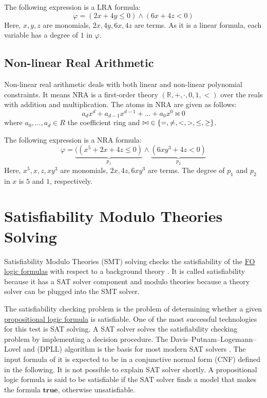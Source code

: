 \begin{example}
    The following expression is a LRA formula:
    $$ \varphi = ( 2x+4y\leq 0 ) \wedge ( 6x+4z< 0 )$$
    Here, $x, y, z$ are monomials, $2x, 4y, 6x, 4z$ are terms.
    As it is a linear formula, each variable has a degree of $1$ in $\varphi$.
\end{example}
\subsection{Non-linear Real Arithmetic}
\label{subsec:NRA}
Non-linear real arithmetic deals with both linear and non-linear polynomial constraints.
It means NRA is a first-order theory $(\mathbb{R}, +, \cdot, 0, 1, <)$ over the reals with addition and multiplication.
The atoms in NRA are given as follows:
$$ a_{d}x^{d} + a_{d-1}x^{d-1} + \ldots + a_{0}x^{0} \bowtie 0  $$
where $ a_{0}, \ldots, a_{d} \in R $ the coefficient ring and $ \bowtie \hspace{1mm}\in \{=, \neq, <, >, \leq, \geq \} $.\newline

\begin{example}
    The following expression is a NRA formula:
    $$ \varphi = \underbrace{ ( (x^{5}+2x+4z\leq 0 ) }\limits_{p_{1}} \wedge \underbrace{ ( 6xy^{3}+4z< 0 ) }\limits_{p_{2}} $$
    Here, $x^{5}, x, z, xy^{3}$ are monomials, $2x, 4z, 6xy^{3}$ are terms.
    The degree of $p_{1}$ and $p_{2}$ in $x$ is $5$ and $1$, respectively.
\end{example}
\section{Satisfiability Modulo Theories Solving}
\label{sec:SMT_Solver}
Satisfiability Modulo Theories (SMT) solving checks the satisfiability of the \hyperref[sec:FOLogic]{FO logic formulas} with respect to a background theory \cite{de2007tutorial}.
It is called satisfiability because it has a SAT solver component and modulo theories because a theory solver can be plugged into the SMT solver.\newline

\noindent The satisfiability checking problem is the problem of determining whether a given \hyperref[sec:PropositionalLogic]{propositional logic formula} is satisfiable.
One of the most successful technologies for this test is SAT solving.
A SAT solver solves the satisfiability checking problem by implementing a decision procedure.
The Davis–Putnam–Logemann–Lovel and (DPLL) algorithm is the basis for most modern SAT solvers \cite{Biere:2009:HSV:1550723}.
The input formula of it is expected to be in a conjunctive normal form (CNF) defined in the following.
It is not possible to explain SAT solver shortly.
A propositional logic formula is said to be satisfiable if the SAT solver finds a model that makes the formula $\mathbf{true}$, otherwise unsatisfiable.\newline

